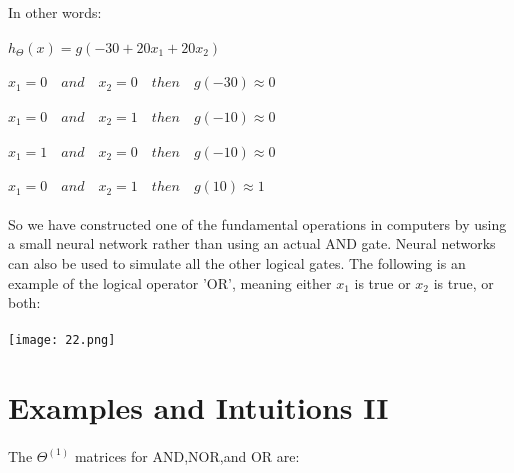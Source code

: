 \documentclass[UTF8]{ctexart}
\begin{document}
\paragraph{}
In other words:
\paragraph{}
\begin{algorithm}
\paragraph{}
$h_{\Theta}(x)=g(-30+20x_{1}+20x_{2})$
\paragraph{}
$x_{1}=0 \quad and \quad x_{2}=0 \quad then \quad g(-30)\approx0$
\paragraph{}
$x_{1}=0 \quad and \quad x_{2}=1 \quad then \quad g(-10)\approx0$
\paragraph{}
$x_{1}=1 \quad and \quad x_{2}=0 \quad then \quad g(-10)\approx0$
\paragraph*{}
$x_{1}=0 \quad and \quad x_{2}=1 \quad then \quad g(10)\approx1$
\end{algorithm}
\paragraph{}
So we have constructed one of the fundamental operations in computers by using a small neural network rather than using an actual AND gate. Neural networks can also be used to simulate all the other logical gates. The following is an example of the logical operator 'OR', meaning either $x_{1}$ is true or $x_{2}$ is true, or both:
\paragraph{}
\texttt{[image: 22.png]}
\newpage
\section{Examples and Intuitions II}
\paragraph{}
The $\Theta^{(1)}$ matrices for AND,NOR,and OR are:
\end{document}
